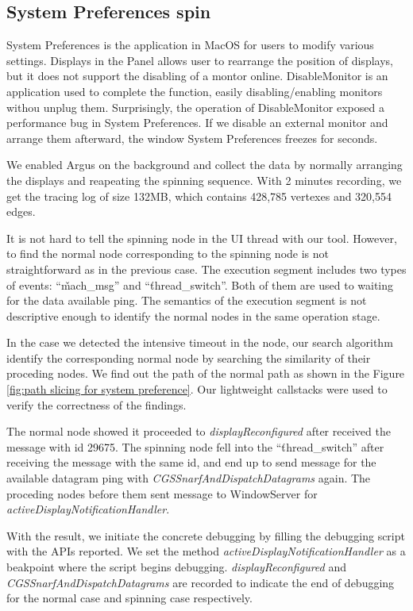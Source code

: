 \subsection{System Preferences spin}
System Preferences is the application in MacOS for users to modify various
settings.  Displays in the Panel allows user to rearrange the position of
displays, but it does not support the disabling of a montor online.
DisableMonitor is an application used to complete the function, easily
disabling/enabling  monitors withou unplug them.  Surprisingly, the operation
of DisableMonitor exposed a performance bug in System Preferences.  If we
disable an external monitor and arrange them afterward, the window System
Preferences freezes for seconds.

We enabled Argus on the background and collect the data by normally arranging
the displays and reapeating the spinning sequence.  With 2 minutes recording,
we get the tracing log of size 132MB, which contains 428,785 vertexes and
320,554 edges.

It is not hard to tell the spinning node in the UI thread with our tool.
However, to find the normal node corresponding to the spinning node is not
straightforward as in the previous case.  The execution segment includes two
types of events: ``\v{mach\_msg}'' and ``\v{thread\_switch}''.  Both of them
are used to waiting for the data available ping.  The semantics of the
execution segment is not descriptive enough to identify the normal nodes in the
same operation stage.

In the case we detected the intensive timeout in the node, our search algorithm
identify the corresponding normal node by searching the similarity of their
proceding nodes.  We find out the path of the normal path as shown in the
Figure \ref{fig:path slicing for system preference}.  Our lightweight
callstacks were used to verify the correctness of the findings.

The normal node showed it proceeded to \textit{displayReconfigured} after
received the message with id 29675.  The spinning node fell into the
``\v{thread\_switch}'' after receiving the message with the same id, and end up
to send message for the available datagram ping with
\textit{CGSSnarfAndDispatchDatagrams} again.  The proceding nodes before them
sent message to WindowServer for \textit{activeDisplayNotificationHandler}.

With the result, we initiate the concrete debugging by filling the debugging
script with the APIs reported.  We set the method
\textit{activeDisplayNotificationHandler} as a beakpoint where the script
begins debugging.  \textit{displayReconfigured} and
\textit{CGSSnarfAndDispatchDatagrams} are recorded to indicate the end of
debugging for the normal case and spinning case respectively.

